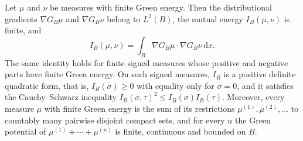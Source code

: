 \begin{proposition}\label{prop:finite-green-energy}
Let $\mu$ and $\nu$ be measures with finite Green energy. Then the distributional gradients $\nabla G_B\mu$ and $\nabla G_B\nu$ belong to $L^2(B)$, the mutual energy $I_B(\mu,\nu)$ is finite, and
\[
 I_B(\mu,\nu)=\int_B\nabla G_B\mu\mathbin{\cdot}\nabla G_B\nu\,\mathrm d x.
\]
The same identity holds for finite signed measures whose positive and negative parts have finite Green energy. On such signed measures, $I_B$ is a positive definite quadratic form, that is, $I_B(\sigma)\geq0$ with equality only for $\sigma=0$, and it satisfies the Cauchy--Schwarz inequality $I_B(\sigma,\tau)^2\leq I_B(\sigma)I_B(\tau)$. Moreover, every measure $\mu$ with finite Green energy is the sum of its restrictions $\mu^{(1)},\mu^{(2)},\ldots$ to countably many pairwise disjoint compact sets, and for every $n$ the Green potential of $\mu^{(1)}+\cdots+\mu^{(n)}$ is finite, continuous and bounded on $B$.
\end{proposition}
